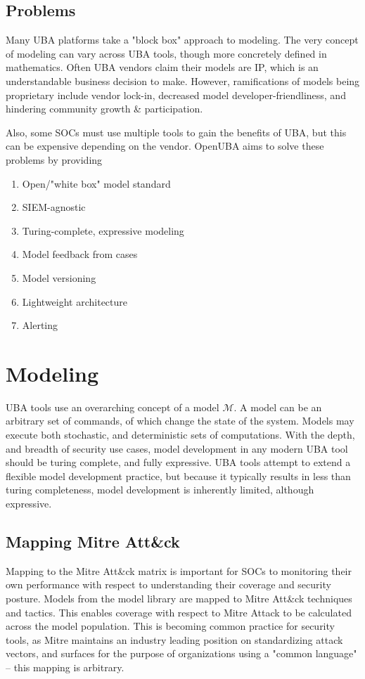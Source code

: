 \documentclass[10pt, titlepage, twocolumn]{report}
\begin{document}
\subsection{Problems}
\hspace*{15pt}
Many UBA platforms take a "block box" approach to modeling. The very concept of modeling can vary across UBA tools, though more concretely defined in mathematics. Often UBA vendors claim their models are IP, which is an understandable business decision to make. However, ramifications of models being proprietary include vendor lock-in, decreased model developer-friendliness, and hindering community growth \& participation. 

Also, some SOCs must use multiple tools to gain the benefits of UBA, but this can be expensive depending on the vendor. OpenUBA aims to solve these problems by providing

\begin{enumerate}
	\item Open/"white box" model standard
	\item SIEM-agnostic
	\item Turing-complete, expressive modeling
	\item Model feedback from cases
	\item Model versioning
	\item Lightweight architecture
	\item Alerting
\end{enumerate}



\section{Modeling}
UBA tools use an overarching concept of a model 
\( \boldsymbol{ \mathcal{M} } \). A model can be an arbitrary set of commands, of which change the state of the system. Models may execute both stochastic, and deterministic sets of computations. With the depth, and breadth of security use cases, model development in any modern UBA tool should be turing complete, and fully expressive. UBA tools attempt to extend a flexible model development practice, but because it typically results in less than turing completeness, model development is inherently limited, although expressive.


\subsection{Mapping Mitre Att\&ck}
\hspace*{15pt}
Mapping to the Mitre Att\&ck matrix is important for SOCs to monitoring their own performance with respect to understanding their coverage and security posture. Models from the model library are mapped to Mitre Att\&ck techniques and tactics. This enables coverage with respect to Mitre Attack to be calculated across the model population. This is becoming common practice for security tools, as Mitre maintains an industry leading position on
standardizing attack vectors, and surfaces for the purpose of organizations using a "common language" -- this mapping is arbitrary.
\end{document}
